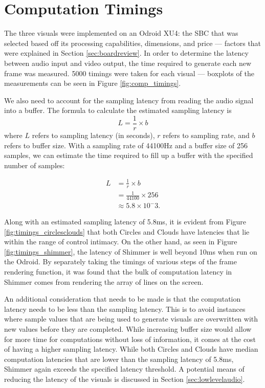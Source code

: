 \documentclass[../initial_thesis.tex]{subfiles}
\begin{document}
\section{Computation Timings} \label{sec:timings}
The three visuals were implemented on an Odroid XU4: the SBC that was selected based off its processing capabilities, dimensions, and price --- factors that were explained in Section \ref{sec:boardreview}. In order to determine the latency between audio input and video output, the time required to generate each new frame was measured. 5000 timings were taken for each visual --- boxplots of the measurements can be seen in Figure \ref{fig:comp_timings}.

We also need to account for the sampling latency from reading the audio signal into a buffer. The formula to calculate the estimated sampling latency is
\begin{equation*}
  L = \frac{1}{r} \times b
\end{equation*}
where $L$ refers to sampling latency (in seconds), $r$ refers to sampling rate, and $b$ refers to buffer size. With a sampling rate of 44100Hz and a buffer size of 256 samples, we can estimate the time required to fill up a buffer with the specified number of samples:

\begin{align*}
  L &= \frac{1}{r} \times b\\
          &= \frac{1}{44100} \times 256\\
          &\approx 5.8 \times 10^-3.
\end{align*}

Along with an estimated sampling latency of 5.8ms, it is evident from Figure \ref{fig:timings_circlesclouds} that both Circles and Clouds have latencies that lie within the range of control intimacy. On the other hand, as seen in Figure \ref{fig:timings_shimmer}, the latency of Shimmer is well beyond 10ms when run on the Odroid. By separately taking the timings of various steps of the frame rendering function, it was found that the bulk of computation latency in Shimmer comes from rendering the array of lines on the screen.

An additional consideration that needs to be made is that the computation latency needs to be less than the sampling latency. This is to avoid instances where sample values that are being used to generate visuals are overwritten with new values before they are completed. While increasing buffer size would allow for more time for computations without loss of information, it comes at the cost of having a higher sampling latency. While both Circles and Clouds have median computation latencies that are lower than the sampling latency of 5.8ms, Shimmer again exceeds the specified latency threshold. A potential means of reducing the latency of the visuals is discussed in Section \ref{sec:lowlevelaudio}. \par
\end{document}

